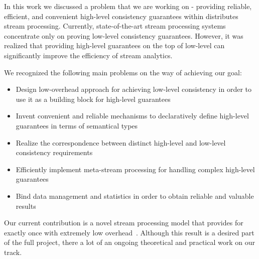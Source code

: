 \label{fs-phd-summary}

In this work we discussed a problem that we are working on - providing reliable, efficient, and convenient high-level consistency guarantees within distributes stream processing. Currently, state-of-the-art stream processing systems concentrate only on proving low-level consistency guarantees. However, it was realized that providing high-level guarantees on the top of low-level can significantly improve the efficiency of stream analytics. 

We recognized the following main problems on the way of achieving our goal:

\begin{itemize}
    \item Design low-overhead approach for achieving low-level consistency in order to use it as a building block for high-level guarantees  
    \item Invent convenient and reliable mechanisms to declaratively define high-level guarantees in terms of semantical types
    \item Realize the correspondence between distinct high-level and low-level consistency requirements
    \item Efficiently implement meta-stream processing for handling complex high-level guarantees
    \item Bind data management and statistics in order to obtain reliable and valuable results  
\end{itemize}

Our current contribution is a novel stream processing model that provides for exactly once with extremely low overhead~\cite{we2018seim, we2018beyondmr}. Although this result is a desired part of the full project, there a lot of an ongoing theoretical and practical work on our track.   